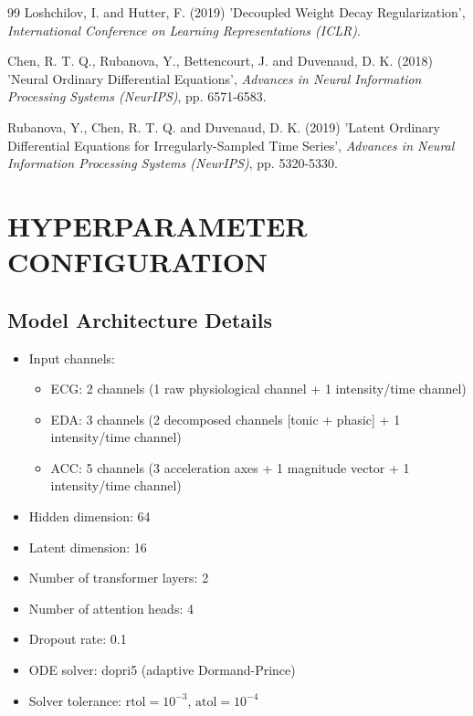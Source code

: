 \documentclass[12pt, a4paper]{report}
\numberwithin{equation}{chapter}
\begin{document}
\begin{thebibliography}{99}
Loshchilov, I. and Hutter, F. (2019) 'Decoupled Weight Decay Regularization', \textit{International Conference on Learning Representations (ICLR)}.

Chen, R. T. Q., Rubanova, Y., Bettencourt, J. and Duvenaud, D. K. (2018) 'Neural Ordinary Differential Equations', \textit{Advances in Neural Information Processing Systems (NeurIPS)}, pp. 6571-6583.

Rubanova, Y., Chen, R. T. Q. and Duvenaud, D. K. (2019) 'Latent Ordinary Differential Equations for Irregularly-Sampled Time Series', \textit{Advances in Neural Information Processing Systems (NeurIPS)}, pp. 5320-5330.

\end{thebibliography}

\appendix

\chapter{HYPERPARAMETER CONFIGURATION}
\section{Model Architecture Details}
\begin{itemize}
    \setlength{\itemsep}{1pt}
    \setlength{\parskip}{0pt}
    \setlength{\parsep}{0pt}
    \item Input channels:
    \begin{itemize}
        \setlength{\itemsep}{1pt}
        \setlength{\parskip}{0pt}
        \setlength{\parsep}{0pt}
        \item ECG: 2 channels (1 raw physiological channel + 1 intensity/time channel)
        \item EDA: 3 channels (2 decomposed channels [tonic + phasic] + 1 intensity/time channel)
        \item ACC: 5 channels (3 acceleration axes + 1 magnitude vector + 1 intensity/time channel)
    \end{itemize}
    \item Hidden dimension: 64
    \item Latent dimension: 16
    \item Number of transformer layers: 2
    \item Number of attention heads: 4
    \item Dropout rate: 0.1
    \item ODE solver: dopri5 (adaptive Dormand-Prince)
    \item Solver tolerance: $\text{rtol} = 10^{-3}$, $\text{atol} = 10^{-4}$
\end{itemize}
\end{document}
